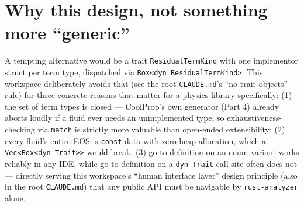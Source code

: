 \documentclass[11pt]{article}
\begin{document}
\section{Why this design, not something more ``generic''}

A tempting alternative would be a trait \texttt{ResidualTermKind} with one
implementor struct per term type, dispatched via \texttt{Box<dyn
ResidualTermKind>}. This workspace deliberately avoids that (see the
root \texttt{CLAUDE.md}'s ``no trait objects'' rule) for three concrete
reasons that matter for a physics library specifically: (1) the set of term
types is closed — CoolProp's own generator (Part 4) already aborts loudly
if a fluid ever needs an unimplemented type, so exhaustiveness-checking via
\texttt{match} is strictly more valuable than open-ended extensibility;
(2) every fluid's entire EOS is \texttt{const} data with zero heap
allocation, which a \texttt{Vec<Box<dyn Trait>>} would break; (3) go-to-definition
on an enum variant works reliably in any IDE, while go-to-definition on a
\texttt{dyn Trait} call site often does not — directly serving this
workspace's ``human interface layer'' design principle (also in the root
\texttt{CLAUDE.md}) that any public API must be navigable by
\texttt{rust-analyzer} alone.

\printbibliography
\end{document}
